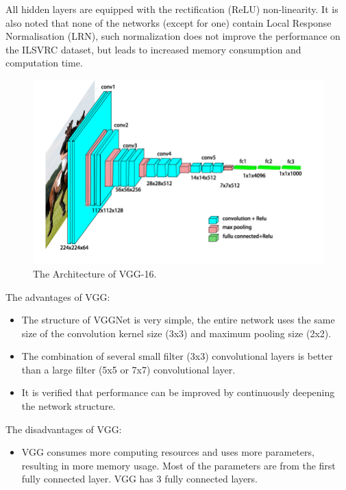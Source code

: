 All hidden layers are equipped with the rectification (ReLU) non-linearity. It is also noted that none of the networks (except for one) contain Local Response Normalisation (LRN), such normalization does not improve the performance on the ILSVRC dataset, but leads to increased memory consumption and computation time.


\begin{figure}[!htbp]
	\centering
	\includegraphics[width=0.8\linewidth]{figures/vgg16}
	\caption[The Architecture of VGG-16]{The Architecture of VGG-16.}
	\label{fig:vgg16}
\end{figure}

The advantages of VGG:
\begin{itemize}
	\item The structure of VGGNet is very simple, the entire network uses the same size of the convolution kernel size (3x3) and maximum pooling size (2x2).
	\item The combination of several small filter (3x3) convolutional layers is better than a large filter (5x5 or 7x7) convolutional layer.
	\item It is verified that performance can be improved by continuously deepening the network structure.
\end{itemize}

The disadvantages of VGG:

\begin{itemize}
	\item VGG consumes more computing resources and uses more parameters, resulting in more memory usage. Most of the parameters are from the first fully connected layer. VGG has 3 fully connected layers.
\end{itemize}



